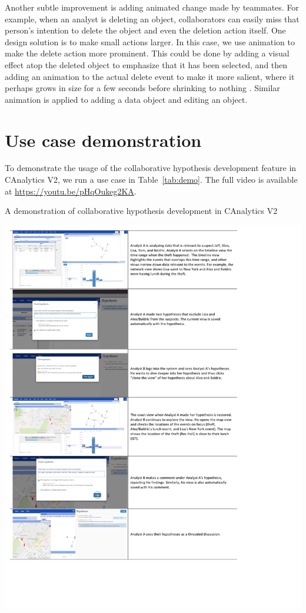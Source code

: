 Another subtle improvement is adding animated change made by teammates. For example, when an analyst is deleting an object, collaborators can easily miss that person's intention to delete the object and even the deletion action itself. One design solution is to make small actions larger. In this case, we use animation to make the delete action more prominent. This could be done by adding a visual effect atop the deleted object to emphasize that it has been selected, and then adding an animation to the actual delete event to make it more salient, where it perhaps grows in size for a few seconds before shrinking to nothing \citep{Greenberg2001}. Similar animation is applied to adding a data object and editing an object.


\section{Use case demonstration}

To demonstrate the usage of the collaborative hypothesis development feature in CAnalytics V2, we run a use case in Table~\ref{tab:demo}. The full video is available at \url{https://youtu.be/pHqOukeg2KA}.

\begin{table}
	\caption{A demonstration of collaborative hypothesis development in CAnalytics V2}
	\label{tab:demo}
	\includegraphics[width=1.2\columnwidth]{05-Study_two/img/demo.pdf}
\end{table}
